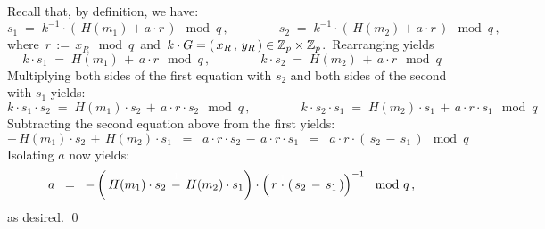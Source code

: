 \vskip 0.3cm
\noindent
Recall that, by definition, we have:
\begin{equation*}
s_{1} \;=\; k^{-1} \cdot \left(\,H(m_{1}) + a \cdot r \,\right) \!\!\!\mod q\,,
\quad\quad\quad\quad
s_{2} \;=\; k^{-1} \cdot \left(\,H(m_{2}) + a \cdot r \,\right) \!\!\!\mod q\,,
\end{equation*}
where \,$r \,:=\, x_{R} \!\mod q$\, and \,$k \cdot G = (\,x_{R}\,,\,y_{R}\,) \in \mathbb{Z}_{p} \times \mathbb{Z}_{p}$.\,
Rearranging yields
\begin{equation*}
k \cdot s_{1} \;=\; H(m_{1}) \,+\, a \cdot r \!\mod q\,,
\quad\quad\quad\quad
k \cdot s_{2} \;=\; H(m_{2}) \,+\, a \cdot r \!\mod q
\end{equation*}
Multiplying both sides of the first equation with $s_{2}$ and
both sides of the second with $s_{1}$ yields:
\begin{equation*}
k \cdot s_{1} \cdot s_{2} \;=\; H(m_{1}) \cdot s_{2} \,+\, a \cdot r \cdot s_{2} \!\mod q\,,
\quad\quad\quad\quad
k \cdot s_{2} \cdot s_{1} \;=\; H(m_{2}) \cdot s_{1} \,+\, a \cdot r \cdot s_{1} \!\mod q
\end{equation*}
Subtracting the second equation above from the first yields:
\begin{equation*}
- \, H(m_{1}) \cdot s_{2} \, + \, H(m_{2}) \cdot s_{1}
\;\;=\;\;
	a \cdot r \cdot s_{2} \,-\, a \cdot r \cdot s_{1}
\;\;=\;\;
	a \cdot r \cdot \left(\, s_{2} \,-\, s_{1} \,\right) \mod q
\end{equation*}
Isolating $a$ now yields:
\begin{equation*}
a
\;\;=\;\;
	- \left(\,H(m_{1}) \cdot s_{2} \, \overset{{\color{white}1}}{-} \, H(m_{2}) \cdot s_{1} \right)
	\cdot
	\left(\,r \overset{{\color{white}1}}{\cdot} \left(\, s_{2} \,-\, s_{1} \,\right)\right)^{-1}
	 \mod q\,,
\end{equation*}
as desired.
\qed


